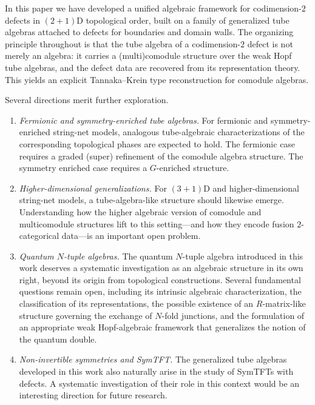 \documentclass[a4paper,11pt]{article}
\theoremstyle{definition}
\theoremstyle{remark}
\begin{document}
In this paper we have developed a unified algebraic framework for codimension-$2$ defects in $(2+1)$D topological order, built on a family of generalized tube algebras attached to defects for boundaries and domain walls. The organizing principle throughout is that the tube algebra of a codimension-$2$ defect is not merely an algebra: it carries a (multi)comodule structure over the weak Hopf tube algebras, and the defect data are recovered from its representation theory. This yields an explicit Tannaka--Krein type reconstruction for comodule algebras.

Several directions merit further exploration.
\begin{enumerate}
    \item \emph{Fermionic and symmetry-enriched tube algebras.} For fermionic and symmetry-enriched string-net models, analogous tube-algebraic characterizations of the corresponding topological phases are expected to hold. The fermionic case requires a graded (super) refinement of the comodule algebra structure. The symmetry enriched case requires a $G$-enriched structure.
    \item \emph{Higher-dimensional generalizations.} For $(3+1)$D and higher-dimensional string-net models, a tube-algebra-like structure should likewise emerge. Understanding how the higher algebraic version of comodule and multicomodule structures lift to this setting---and how they encode fusion $2$-categorical data---is an important open problem.
    \item \emph{Quantum $N$-tuple algebras.} The quantum $N$-tuple algebra introduced in this work deserves a systematic investigation as an algebraic structure in its own right, beyond its origin from topological constructions. Several fundamental questions remain open, including its intrinsic algebraic characterization, the classification of its representations, the possible existence of an $R$-matrix-like structure governing the exchange of $N$-fold junctions, and the formulation of an appropriate weak Hopf-algebraic framework that generalizes the notion of the quantum double.
   \item \emph{Non-invertible symmetries and SymTFT.} The generalized tube algebras developed in this work also naturally arise in the study of SymTFTs with defects. A systematic investigation of their role in this context would be an interesting direction for future research.
\end{enumerate}
\end{document}

